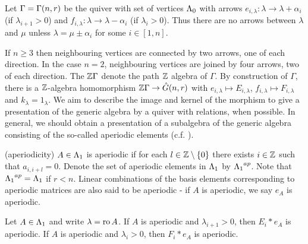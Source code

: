 \documentclass[a4paper, 11pt]{report}
\begin{document}
Let $\Gamma =\Gamma(n,r)$ be the quiver with set of vertices ${\Lambda_0}$ with arrows $e_{i,\lambda}\colon\lambda\to\lambda +\alpha_i$ (if $\lambda_{i+1}>0$) and $f_{i,\lambda}\colon\lambda\to\lambda -\alpha_i$ (if $\lambda_i>0$). Thus there are no arrows between $\lambda$ and $\mu$ unless $\lambda = \mu\pm \alpha_i$ for some $i\in [1,n]$.

If $n\geq 3$ then neighbouring vertices are connected by two arrows, one of each direction. In the case $n=2$, neighbouring vertices are joined by four arrows, two of each direction. The $\mathbb{Z}\Gamma$ denote the path $\mathbb{Z}$ algebra of $\Gamma$. By construction of $\Gamma$, there is a $\mathbb{Z}$-algebra homomorphism $\mathbb{Z}\Gamma\to\hat{G}(n,r)$ with $e_{i,\lambda}\mapsto E_{i,\lambda}$, $f_{i,\lambda}\mapsto F_{i,\lambda}$ and $k_\lambda = 1_\lambda$. We aim to describe the image and kernel of the morphism to give a presentation of the generic algebra by a quiver with relations, when possible. In general, we should obtain a presentation of a subalgebra of the generic algebra consisting of the so-called aperiodic elements (c.f. \cite{lusztig99}).

\begin{definition}(aperiodicity)\label{def:aperiodic}
$A\in{\Lambda_1}$ is aperiodic if for each $l\in\mathbb{Z}\setminus\{0\}$ there exists $i\in\mathbb{Z}$ such that $a_{i,i+l}=0$. Denote the set of aperiodic elements in ${\Lambda_1}$ by ${\Lambda_1}^{ap}$. Note that ${\Lambda_1}^{ap}={\Lambda_1}$ if $r<n$. Linear combinations of the basis elements corresponding to aperiodic matrices are also said to be aperiodic - if $A$ is aperiodic, we say $e_A$ is aperiodic.
\end{definition}

\begin{lemma}\label{lemma:words-are-aperiodic}
Let $A\in{\Lambda_1}$ and write $\lambda=\operatorname{ro}{A}$. If $A$ is aperiodic and $\lambda_{i+1}>0$, then $E_i\ast e_A$ is aperiodic. If $A$ is aperiodic and $\lambda_i>0$, then $F_i\ast e_A$ is aperiodic.
\end{lemma}
\end{document}
